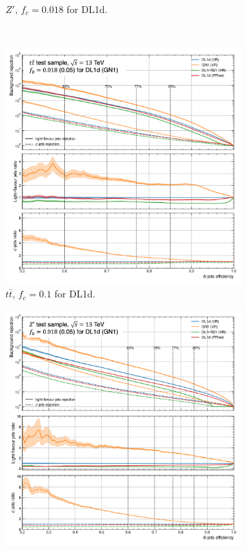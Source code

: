 \begin{figure}[h!]
\begin{subfigure}[t]{0.48\textwidth}
    \caption{$Z'$, $f_c = 0.018$ for DL1d.}
    \label{fig:dl1dVRROCzp}
  \end{subfigure} \\
  \begin{subfigure}[t]{0.48\textwidth}
    \centering
    \includegraphics[width=\textwidth]{Images/FTAG/VRDL1d/ROC/ttbupf.png}
    \caption{$t\bar{t}$, $f_c = 0.1$ for DL1d.}
    \label{fig:dl1dVRROCttc}
  \end{subfigure}
  \begin{subfigure}[t]{0.48\textwidth}
    \centering
    \includegraphics[width=\textwidth]{Images/FTAG/VRDL1d/ROC/zpbupf.png}

\end{subfigure}
\end{figure}
